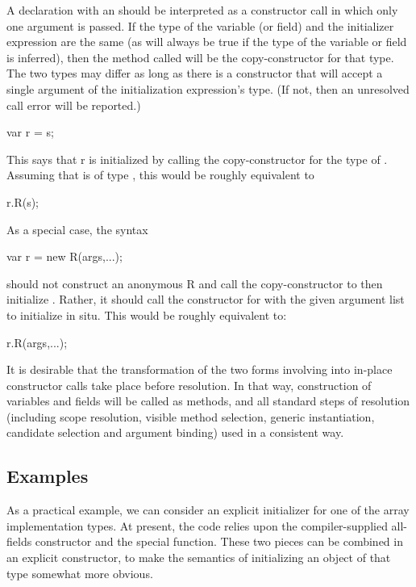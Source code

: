 A declaration with an  should be interpreted as a constructor call
in which only one argument is passed.  If the type of the variable (or field) and the initializer
expression are the same (as will always be true if the type of the variable or field is
inferred), then the method called will be the copy-constructor for that type.  The two
types may differ as long as there is a constructor that will accept a single argument of
the initialization expression's type.  (If not, then an unresolved call error will be
reported.)
\begin{chapel}
var r = s;
\end{chapel}
This says that r is initialized by calling the copy-constructor for the type of .
Assuming that  is of type , this would be roughly equivalent to
\begin{chapel}
r.R(s);
\end{chapel}

As a special case, the syntax
\begin{chapel}
var r = new R(args,...);
\end{chapel}
\noindent
should not construct an anonymous R and call the copy-constructor to then initialize
.  Rather, it should call the constructor for  with the given argument
list to initialize  in situ.  This would be roughly equivalent to:
\begin{chapel}
r.R(args,...);
\end{chapel}

It is desirable that the transformation of the two forms involving \chpl{=} into in-place
constructor calls take place before resolution.  In that way, construction of variables
and fields will be called as methods, and all standard steps of resolution (including
scope resolution, visible method selection, generic instantiation, candidate selection and
argument binding) used in a consistent way.

\subsection{Examples}

As a practical example, we can consider an explicit initializer for one of the array
implementation types.  At present, the code relies upon the compiler-supplied all-fields
constructor and the special  function.  These two pieces can be combined in an
explicit constructor, to make the semantics of initializing an object of that type
somewhat more obvious.

